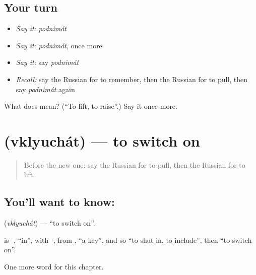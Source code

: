 \subsection*{Your turn}
\begin{itemize}
\raggedright
  \item \emph{Say it:} \emph{podnimát}
  \item \emph{Say it:} \emph{podnimát}, once more
  \item \emph{Say it:} say \emph{podnimát}
  \item \emph{Recall:} say the Russian for to remember, then the Russian for to pull, then say \emph{podnimát} again
\end{itemize}

\begin{tcolorbox}[breakable,colback=teal!4,colframe=teal!35!black,title={Before you move on}]
What does  mean? (\textquotedblleft{}To lift, to raise\textquotedblright{}.) Say it once more.
\end{tcolorbox}
\section[\texorpdfstring{\ru{включать} (vklyuchát)}{включать (vklyuchát)}]{ (vklyuchát) — to switch on}

\label{lesson:RU-C175-vklyuchat}



\begin{quote}
Before the new one: say the Russian for to pull, then the Russian for to lift.
\end{quote}

\subsection*{You'll want to know: }
\textbf{} (\emph{vklyuchát}) — \textquotedblleft{}to switch on\textquotedblright{}.

\begin{cousinweb}
\textbf{} is \emph{-}, \textquotedblleft{}in\textquotedblright{}, with \emph{-}, from \emph{}, \textquotedblleft{}a key\textquotedblright{}, and so \textquotedblleft{}to shut in, to include\textquotedblright{}, then \textquotedblleft{}to switch on\textquotedblright{}.
\end{cousinweb}

\begin{grammarlens}[title={What you've built}]
One more word for this chapter.
\end{grammarlens}

